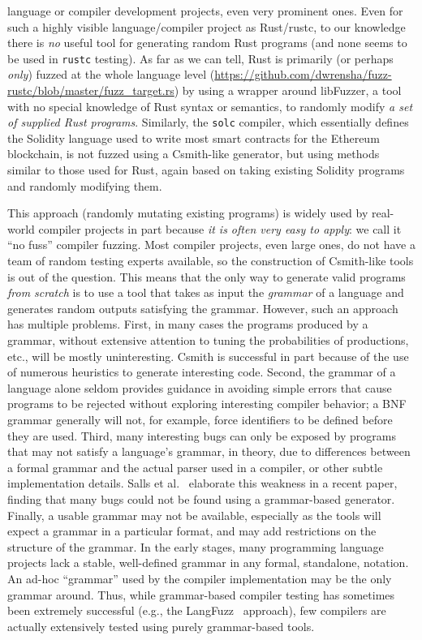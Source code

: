 language or compiler development projects, even very prominent ones.  Even for such a highly
visible language/compiler project as Rust/rustc, to our knowledge
there is \emph{no} useful tool for generating random Rust programs
(and none seems to be
used in {\tt rustc} testing).  As far as we can tell, Rust
is primarily (or perhaps \emph{only}) fuzzed at the whole language
level
(\url{https://github.com/dwrensha/fuzz-rustc/blob/master/fuzz_target.rs}) by
using a wrapper around libFuzzer, a tool with no special knowledge of Rust
syntax or semantics, to randomly modify \emph{a set of supplied Rust
programs}.  Similarly, the {\tt solc} compiler, which essentially
defines the Solidity language used to write most smart contracts for
the Ethereum blockchain, is not fuzzed using a Csmith-like
generator, but using methods similar to those used for
Rust, again based on taking
existing Solidity programs and randomly modifying them.

This approach (randomly mutating existing programs) is widely used by
real-world compiler projects in part because \emph{it is often very easy to
  apply}: we call it ``no fuss'' compiler fuzzing.  Most compiler projects, even large ones, do not have a team
of random testing experts available, so the construction of
Csmith-like tools is out of the question.  This means that the only
way to generate valid programs \emph{from scratch} is to use a tool that takes as
input the \emph{grammar} of a language and generates random outputs
satisfying the grammar.   However, such an approach has multiple problems.
First, in many cases the programs produced by a grammar, without
extensive attention to tuning the probabilities of productions, etc., will be mostly uninteresting.
Csmith is successful in part because of the use of numerous heuristics
to generate interesting code.  Second, the grammar of a language alone
seldom provides guidance in avoiding simple errors that cause programs
to be rejected without exploring interesting compiler behavior; a BNF
grammar generally will not, for example, force identifiers to be
defined before they are used.  Third, many interesting bugs can only
be exposed by programs that may not satisfy a language's grammar, in
theory, due to differences between a formal grammar and the actual
parser used in a compiler, or other subtle implementation details.
Salls et al.~\cite{Salls2021TokenLevel} elaborate this weakness in a
recent paper, finding that many bugs could not be found using a
grammar-based generator.
Finally, a usable grammar may not be available, especially as the
tools will expect a grammar in a particular format, and may add
restrictions on the structure of the grammar.  In the early stages,
many programming language projects lack a stable, well-defined
grammar in any formal, standalone, notation.  An ad-hoc ``grammar'' used by the compiler implementation may be the
only grammar around.  Thus, while grammar-based compiler
testing has sometimes been extremely successful (e.g., the
LangFuzz~\cite{LangFuzz} approach), few compilers are actually
extensively tested using purely grammar-based tools.

